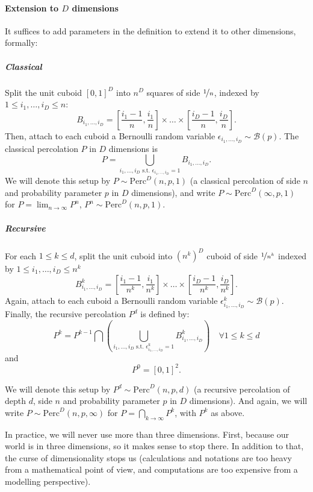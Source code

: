 \paragraph{Extension to $D$ dimensions}
It suffices to add parameters in the definition to extend it to other dimensions, formally:

\subparagraph{Classical}
Split the unit cuboid $\left[ 0,1 \right]^D$ into $n^D$ squares of side $\nicefrac{1}{n}$, indexed by $1 \leq i_1,\dots,i_D \leq n$:
$$B_{i_1,\dots,i_D} = \left[ \frac{i_1-1}{n}, \frac{i_1}{n} \right] \times \dots \times \left[ \frac{i_D-1}{n}, \frac{i_D}{n} \right].$$
Then, attach to each cuboid a Bernoulli random variable $\epsilon_{i_1,\dots,i_D} \sim \mathcal{B}(p)$.
The classical percolation $P$ in $D$ dimensions is
$$P = \bigcup_{i_1,\dots,i_D \text{ s.t. } \epsilon_{i_1,\dots,i_D}=1} B_{i_1,\dots,i_D}.$$
We will denote this setup by $P \sim \text{Perc}^D(n,p,1)$ (a classical percolation of side $n$ and probability parameter $p$ in $D$ dimensions), and write $P \sim \text{Perc}^D(\infty,p,1)$ for $P = \lim_{n \to \infty} P^n$, $P^n \sim \text{Perc}^D(n,p,1)$.

\subparagraph{Recursive}
For each $1 \leq k \leq d$, split the unit cuboid into $\left( n^k \right)^D$ cuboid of side $\nicefrac{1}{n^k}$ indexed by $1 \leq i_1,\dots,i_D \leq n^k$
$$B_{i_1,\dots,i_D}^k = \left[ \frac{i_1-1}{n^k},\frac{i_1}{n^k} \right] \times \dots \times \left[ \frac{i_D-1}{n^k},\frac{i_D}{n^k} \right].$$
Again, attach to each cuboid a Bernoulli random variable $\epsilon_{i_1,\dots,i_D}^k \sim \mathcal{B}(p)$.
Finally, the recursive percolation $P^d$ is defined by:
$$P^k = P^{k-1} \bigcap \left( \bigcup_{i_1,\dots,i_D \text{ s.t. } \epsilon_{i_1,\dots,i_D}^k = 1} B_{i_1,\dots,i_D}^k \right) \quad \forall 1 \leq k \leq d$$
and $$P^0 = \left[ 0,1 \right]^2.$$

We will denote this setup by $P^d \sim \text{Perc}^D(n,p,d)$ (a recursive percolation of depth $d$, side $n$ and probability parameter $p$ in $D$ dimensions).
And again, we will write $P \sim \text{Perc}^D(n,p,\infty)$ for $P  = \bigcap_{k \to \infty} P^k$, with $P^k$ as above.

In practice, we will never use more than three dimensions.
First, because our world is in three dimensions, so it makes sense to stop there.
In addition to that, the curse of dimensionality\cite{WikiDimCurse} stops us (calculations and notations are too heavy from a mathematical point of view, and computations are too expensive from a modelling perspective).


